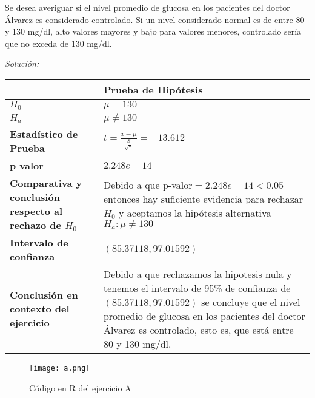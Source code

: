 \documentclass[12pt]{article}
\newenvironment{problem}[2][Problema]{\begin{trivlist}
\item[\hskip \labelsep {\bfseries #1}\hskip \labelsep {\bfseries #2.}]}{\end{trivlist}}
\newenvironment{sol}
    {\emph{Solución:}
    }
    {
    }
\begin{document}
\pagebreak
\begin{problem}{A} 
Se desea averiguar si el nivel promedio de glucosa en los pacientes del doctor Álvarez es considerado controlado. Si un nivel considerado normal es de entre 80 y 130 mg/dl, alto valores mayores y bajo para valores menores, controlado sería que no exceda de 130 mg/dl.
\end{problem}

\begin{sol}
\begin{table}[h!]
\centering
\begin{tabular}{|>{\raggedright\arraybackslash}m{6cm}|>{\raggedright\arraybackslash}m{6cm}|}
\hline
 & \textbf{Prueba de Hipótesis} \\ \hline
$H_0$ & $\mu=130$ \\ \hline
$H_a$ & $\mu\neq130$ \\ \hline
\textbf{Estadístico de Prueba} & \vspace{0.5cm}$t=\frac{\bar{x}-\mu}{\frac{S}{\sqrt{n}}}=-13.612$\vspace{0.5cm} \\ \hline
\textbf{p valor} & $2.248e-14$ \\ \hline
\textbf{Comparativa y conclusión respecto al rechazo de $H_0$} & Debido a que p-valor$=2.248e-14<0.05$ entonces hay suficiente evidencia para rechazar $H_0$ y aceptamos la hipótesis alternativa $H_a: \mu\neq130$ \\ \hline
\textbf{Intervalo de confianza} & $(85.37118,97.01592)$ \\ \hline
\textbf{Conclusión en contexto del ejercicio} & Debido a que rechazamos la hipotesis nula y tenemos el intervalo de 95\% de confianza de $(85.37118,97.01592)$ se concluye que el nivel promedio de glucosa en los pacientes del doctor Álvarez es controlado, esto es, que está entre 80 y 130 mg/dl. \\ \hline
\end{tabular}
\label{tab:hipotesis}
\end{table}

\begin{figure}[h]  %
    \centering      %
    \texttt{[image: a.png]} 
    \caption{Código en R del ejercicio A}
\end{figure}

\end{sol}
\end{document}
